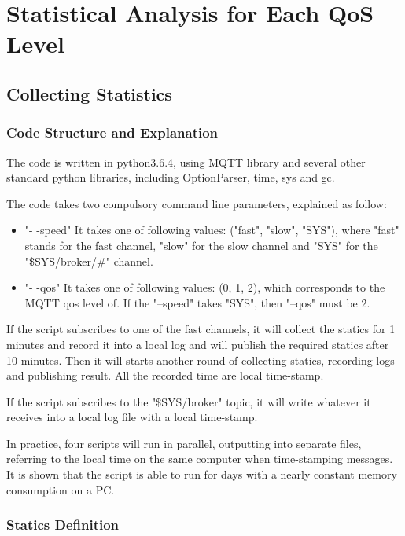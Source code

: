\documentclass[12pt, letterpaper]{article}
\begin{document}
\section{Statistical Analysis for Each QoS Level}

\subsection{Collecting Statistics}

\subsubsection{Code Structure and Explanation}

The code is written in python3.6.4, using MQTT library and several other standard python libraries, including OptionParser, time, sys and gc.

The code takes two compulsory command line parameters, explained as follow:
\begin{itemize}
	\item "- -speed" It takes one of following values: ("fast", "slow", "SYS"), where "fast" stands for the fast channel, "slow" for the slow channel and "SYS" for the "\$SYS/broker/\#" channel.
	
	\item "- -qos" It takes one of following values: (0, 1, 2), which corresponds to the MQTT qos level of. If the "--speed" takes "SYS", then "--qos" must be 2.
	
\end{itemize}

If the script subscribes to one of the fast channels, it will collect the statics for 1 minutes and record it into a local log and will publish the required statics after 10 minutes. Then it will starts another round of collecting statics, recording logs and publishing result. All the recorded time are local time-stamp.

If the script subscribes to the "\$SYS/broker" topic, it will write whatever it receives into a local log file with a local time-stamp.

In practice, four scripts will run in parallel, outputting into separate files, referring to the local time on the same computer when time-stamping messages. It is shown that the script is able to run for days with a nearly constant memory consumption on a PC.

\subsubsection{Statics Definition}
\end{document}

